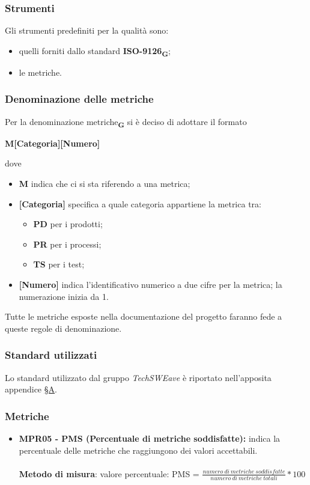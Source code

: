 \subsubsection{Strumenti}
Gli strumenti predefiniti per la qualità sono:
\begin{itemize}
    \item quelli forniti dallo standard \textbf{ISO-9126}\textsubscript{\textbf{G}};
    \item le metriche.
\end{itemize}
\subsubsection{Denominazione delle metriche}
Per la denominazione metriche\textsubscript{\textbf{G}} si è deciso di adottare il formato
\begin{center}
    \textbf{M[Categoria][Numero]}
\end{center}
dove
\begin{itemize}
    \item \textbf{M} indica che ci si sta riferendo a una metrica;
    \item \textbf{[Categoria]} specifica a quale categoria appartiene la metrica tra:\begin{itemize}
              \item \textbf{PD} per i prodotti;
              \item \textbf{PR} per i processi;
              \item \textbf{TS} per i test;
          \end{itemize}
    \item \textbf{[Numero]} indica l'identificativo numerico a due cifre per la metrica; la numerazione inizia da 1.
\end{itemize}
Tutte le metriche esposte nella documentazione del progetto faranno fede a queste regole di denominazione.
\subsubsection{Standard utilizzati}
Lo standard utilizzato dal gruppo \textit{TechSWEave} è riportato nell'apposita appendice \hyperref[sec:A]{§A}.
\subsubsection{Metriche}
\begin{itemize}
    \item \textbf{MPR05 - PMS (Percentuale di metriche soddisfatte):} indica la percentuale delle metriche che raggiungono dei valori accettabili.\\
          \\\textbf{Metodo di misura}: valore percentuale: PMS = $\frac{numero \ di \ metriche \ soddisfatte}{numero \ di \ metriche \ totali} * 100$
\end{itemize}

